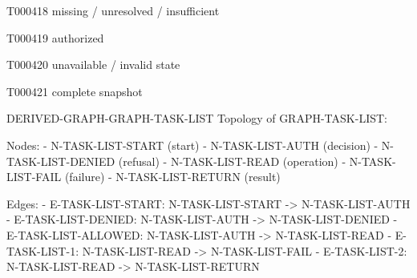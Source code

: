 \documentclass[11pt,a4paper]{article}
\begin{document}
\begin{atlastext}{T000418}
missing / unresolved / insufficient
\end{atlastext}
\begin{atlastext}{T000419}
authorized
\end{atlastext}
\begin{atlastext}{T000420}
unavailable / invalid state
\end{atlastext}
\begin{atlastext}{T000421}
complete snapshot
\end{atlastext}
\par\noindent\begin{minipage}{\linewidth}
\begin{atlasderived}{DERIVED-GRAPH-GRAPH-TASK-LIST}
Topology of GRAPH-TASK-LIST:

Nodes:
- N-TASK-LIST-START (start)
- N-TASK-LIST-AUTH (decision)
- N-TASK-LIST-DENIED (refusal)
- N-TASK-LIST-READ (operation)
- N-TASK-LIST-FAIL (failure)
- N-TASK-LIST-RETURN (result)

Edges:
- E-TASK-LIST-START: N-TASK-LIST-START -> N-TASK-LIST-AUTH
- E-TASK-LIST-DENIED: N-TASK-LIST-AUTH -> N-TASK-LIST-DENIED
- E-TASK-LIST-ALLOWED: N-TASK-LIST-AUTH -> N-TASK-LIST-READ
- E-TASK-LIST-1: N-TASK-LIST-READ -> N-TASK-LIST-FAIL
- E-TASK-LIST-2: N-TASK-LIST-READ -> N-TASK-LIST-RETURN
\end{atlasderived}
\end{minipage}\par
\end{document}
